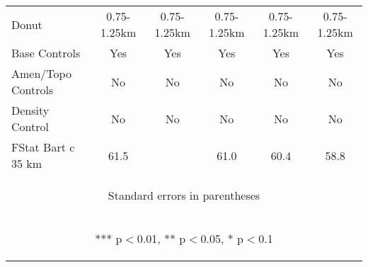 \begin{tabular}{lccccc}
Donut & 0.75-1.25km & 0.75-1.25km & 0.75-1.25km & 0.75-1.25km & 0.75-1.25km \\
Base Controls & Yes & Yes & Yes & Yes & Yes \\
Amen/Topo Controls & No & No & No & No & No \\
Density Control & No & No & No & No & No \\
 FStat Bart c 35 km & 61.5 &  & 61.0 & 60.4 & 58.8 \\ \hline
\multicolumn{6}{c}{\begin{footnotesize} Standard errors in parentheses\end{footnotesize}} \\
\multicolumn{6}{c}{\begin{footnotesize} *** p$<$0.01, ** p$<$0.05, * p$<$0.1\end{footnotesize}} \\
\end{tabular}


